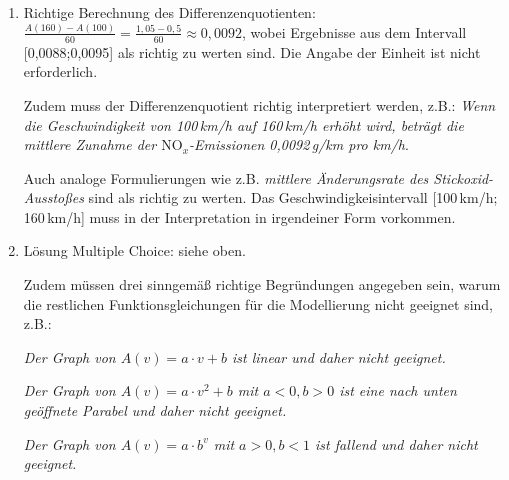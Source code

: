 \begin{langesbeispiel}
{\begin{enumerate}
PKW haben zwar einen Anteil von 76\,\% am Verkehrsaufkommen, sind aber nur für 35\,\% der $\text{NO}_x$-Emissionen verantwortlich. Durch eine Reduktion des Tempolimits von 130\,km/h auf 80\,km/h könnten laut Abbildung 1 maximal die Hälfte dieser Emissionen, also etwa 17\,\%, vermieden werden. Eine Verlagerung der Hälfte des LKW-Verkehrs auf die Schiene wäre daher die wirkungsvollere Maßnahme zur Reduktion der $\text{NO}_x$-Emissionen.

Anmerkung: Auch eine Begründung mit gerundeten relativen Anteilen (drei Viertel
 etc.) ist als richtig zu werten.
	
	\item Richtige Berechnung des Differenzenquotienten: $\frac{A(160)-A(100)}{60}=\frac{1,05-0,5}{60}\approx 0,0092$, wobei Ergebnisse aus dem Intervall [0,0088;0,0095] als richtig zu werten sind. Die Angabe der Einheit ist nicht erforderlich.
	
	Zudem muss der Differenzenquotient richtig interpretiert werden, z.B.: \textit{Wenn die Geschwindigkeit von 100\,km/h auf 160\,km/h erhöht wird, beträgt die mittlere Zunahme der $\text{NO}_x$-Emissionen 0,0092\,g/km pro km/h}.
	
	Auch analoge Formulierungen wie z.B. \textit{mittlere Änderungsrate des Stickoxid-Ausstoßes} sind als richtig zu werten. Das Geschwindigkeisintervall [100\,km/h; 160\,km/h] muss in der Interpretation in irgendeiner Form vorkommen.
	
	\item Lösung Multiple Choice: siehe oben.
	
	Zudem müssen drei sinngemäß richtige Begründungen angegeben sein, warum die restlichen Funktionsgleichungen für die Modellierung nicht geeignet sind, z.B.:
	
	\textit{Der Graph von $A(v)=a\cdot v+b$ ist linear und daher nicht geeignet.}
	
	\textit{Der Graph von $A(v)=a\cdot v^2+b$ mit $a<0,b>0$ ist eine nach unten geöffnete Parabel und daher nicht geeignet.}
	
	\textit{Der Graph von $A(v)=a\cdot b^v$ mit $a>0,b<1$ ist fallend und daher nicht geeignet.}
	
		\end{enumerate}}
\end{langesbeispiel}